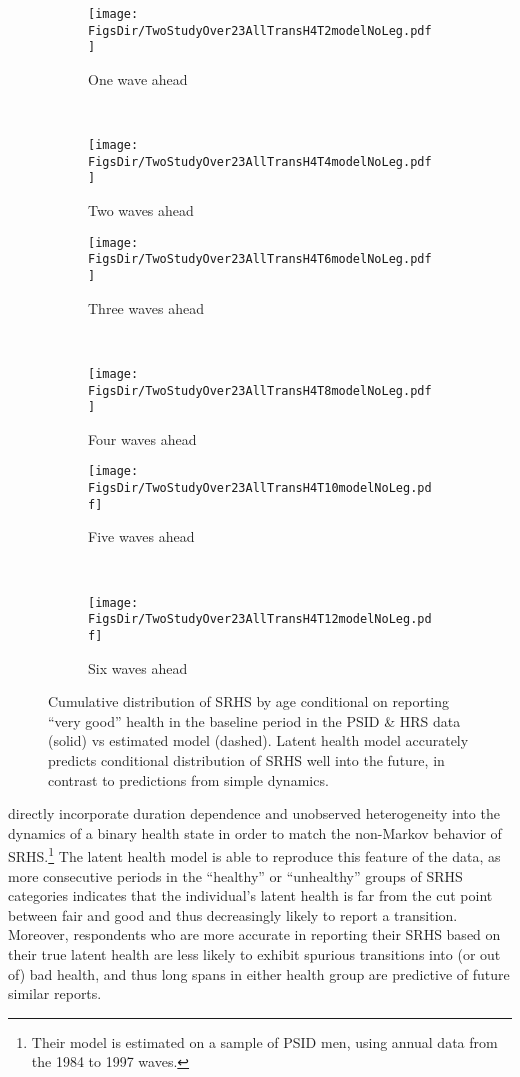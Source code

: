 \documentclass[12pt,pdftex,letterpaper]{article}
\newcommand{\RootDir}{..}
\newcommand{\FigsDir}{\RootDir/Figures}
\begin{document}
\begin{figure}
	\centering
	\begin{subfigure}[b]{0.45\textwidth}
		\texttt{[image: \\FigsDir/TwoStudyOver23AllTransH4T2modelNoLeg.pdf]}
		\caption{One wave ahead}\label{fig:Model1AheadVeryGood}
	\end{subfigure}
	~
	\begin{subfigure}[b]{0.45\textwidth}
		\texttt{[image: \\FigsDir/TwoStudyOver23AllTransH4T4modelNoLeg.pdf]}
		\caption{Two waves ahead}\label{fig:Model2AheadVeryGood}
	\end{subfigure}
	
	\begin{subfigure}[b]{0.45\textwidth}
		\texttt{[image: \\FigsDir/TwoStudyOver23AllTransH4T6modelNoLeg.pdf]}
		\caption{Three waves ahead}\label{fig:Model3AheadVeryGood}
	\end{subfigure}
	~
	\begin{subfigure}[b]{0.45\textwidth}
		\texttt{[image: \\FigsDir/TwoStudyOver23AllTransH4T8modelNoLeg.pdf]}
		\caption{Four waves ahead}\label{fig:Model4AheadVeryGood}
	\end{subfigure}
	
	\begin{subfigure}[b]{0.45\textwidth}
		\texttt{[image: \\FigsDir/TwoStudyOver23AllTransH4T10modelNoLeg.pdf]}
		\caption{Five waves ahead}\label{fig:Model5AheadVeryGood}
	\end{subfigure}
	~
	\begin{subfigure}[b]{0.45\textwidth}
		\texttt{[image: \\FigsDir/TwoStudyOver23AllTransH4T12modelNoLeg.pdf]}
		\caption{Six waves ahead}\label{fig:Model6AheadVeryGood}
	\end{subfigure}
	\caption{Cumulative distribution of SRHS by age conditional on reporting ``very good'' health in the baseline period in the PSID \& HRS data (solid) vs estimated model (dashed). Latent health model accurately predicts conditional distribution of SRHS well into the future, in contrast to predictions from simple dynamics.}\label{fig:ModelTransVG}
\end{figure}


\cite{DeNardi18} directly incorporate duration dependence and unobserved heterogeneity into the dynamics of a binary health state in order to match the non-Markov behavior of SRHS.\footnote{Their model is estimated on a sample of PSID men, using annual data from the 1984 to 1997 waves.}  The latent health model is able to reproduce this feature of the data, as more consecutive periods in the ``healthy'' or ``unhealthy'' groups of SRHS categories indicates that the individual's latent health is far from the cut point between fair and good and thus decreasingly likely to report a transition. Moreover, respondents who are more accurate in reporting their SRHS based on their true latent health are less likely to exhibit spurious transitions into (or out of) bad health, and thus long spans in either health group are predictive of future similar reports.
\end{document}
